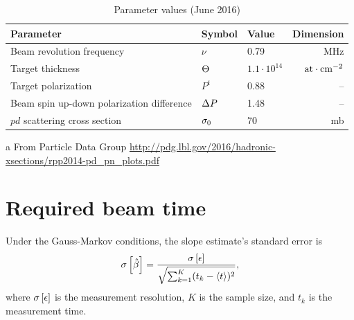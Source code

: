 \documentclass{article}
\begin{document}
\begin{table}
\centering
\caption{Parameter values (June 2016)\label{tbl:Param}}
\begin{threeparttable}[h]
\begin{tabular}{p{4.5cm}llr}
	\hline\hline
	Parameter                                 & Symbol            & Value              &               Dimension \\ \hline
	Beam revolution frequency                 & $\nu$             & 0.79               &                     MHz \\
	Target thickness                          & $\Thick$          & $1.1\cdot 10^{14}$ & $\mathrm{at\cdot cm^{-2}}$ \\
	Target polarization                       & $P^t$             & 0.88               &                      -- \\
	Beam spin up-down polarization difference & $\DP$             & 1.48               &                      -- \\
	$pd$ scattering cross section             & $\CS[0]$\tnote{a} & 70                 &                      mb \\ \hline
\end{tabular}
\begin{tablenotes}
	\item[a]{From Particle Data Group \url{http://pdg.lbl.gov/2016/hadronic-xsections/rpp2014-pd_pn_plots.pdf}}
\end{tablenotes}
\end{threeparttable}
\end{table}

\section{Required beam time}
\newcommand{\Tint}{\Delta t}

Under the Gauss-Markov conditions, the slope estimate's standard error is
\begin{equation}\label{eq:SlpVarGM}
	\SE{\slp*} = \frac{\SE{\err}}{\sqrt{\sum_{k=1}^K (t_k - \avg{t})^2}},
\end{equation}
where $\SE{\err}$ is the measurement resolution, $K$ is the sample size, and $t_k$ is the measurement time.
\end{document}
